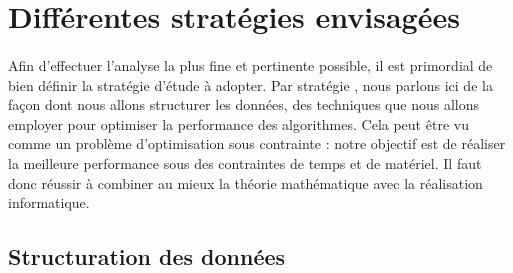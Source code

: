 \documentclass[14pt, openany]{article}
\begin{document}
\section{Différentes stratégies envisagées}
\paragraph{}
Afin d'effectuer l'analyse la plus fine et pertinente possible, il est primordial de bien définir la stratégie d'étude à adopter. Par \og stratégie \fg{}, nous parlons ici de la façon dont nous allons structurer les données, des techniques que nous allons employer pour optimiser la performance des algorithmes. Cela peut être vu comme un problème d'optimisation sous contrainte : notre objectif est de réaliser la meilleure performance sous des contraintes de temps et de matériel. Il faut donc réussir à combiner au mieux la théorie mathématique avec la réalisation informatique.

\subsection{Structuration des données}
\end{document}
